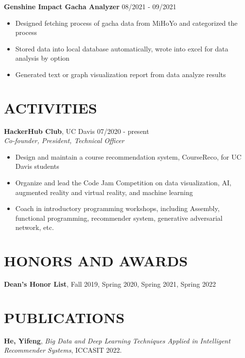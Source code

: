 \documentclass[margin,line]{res}
\begin{document}
\begin{resume}
\textbf{Genshine Impact Gacha Analyzer} \hfill {08/2021 - 09/2021} \\
\begin{itemize}
	\item Designed fetching process of gacha data from MiHoYo and categorized the process 
	\item Stored data into local database automatically, wrote into excel for data analysis by option
	\item Generated text or graph visualization report from data analyze results
\end{itemize}

\section{\sc ACTIVITIES}
\textbf{HackerHub Club}, UC Davis \hfill {07/2020 - present} \\
\textit{Co-founder, President, Technical Officer}
\begin{itemize}
	\item Design and maintain a course recommendation system, CourseReco, for UC Davis students 
	\item Organize and lead the Code Jam Competition on data visualization, AI, augmented reality and virtual reality, and machine learning 
	\item Coach in introductory programming workshops, including Assembly, functional programming, recommender system, generative adversarial network, etc. 
\end{itemize}

\section{\sc HONORS AND AWARDS} 
\textbf{Dean's Honor List}, Fall 2019, Spring 2020, Spring 2021, Spring 2022
\vspace{0.5cm}

\section{\sc PUBLICATIONS}
\textbf{He, Yifeng}, \textit{Big Data and Deep Learning Techniques Applied in Intelligent Recommender Systems}, ICCASIT 2022.



\end{resume}
\end{document}
